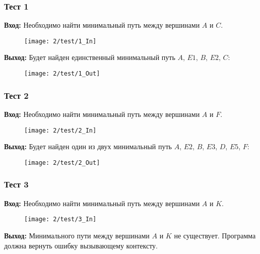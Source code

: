 \newpage

\subsubsection{Тест 1}
\textbf{Вход:}
Необходимо найти минимальный путь между вершинами $A$ и $C$. 

\begin{figure}[h!]
  \centering
  \texttt{[image: 2/test/1\_In]}
  \label{fig:Test1_In}
\end{figure}

\textbf{Выход:}
Будет найден единственный минимальный путь $A$, $E1$, $B$, $E2$, $C$:

\begin{figure}[h!]
  \centering
  \texttt{[image: 2/test/1\_Out]}
  \label{fig:Test1_Out}
\end{figure}

\newpage

\subsubsection{Тест 2}
\textbf{Вход:}
Необходимо найти минимальный путь между вершинами $A$ и $F$.

\begin{figure}[h!]
  \centering
  \texttt{[image: 2/test/2\_In]}
  \label{fig:Test2_In}
\end{figure}

\textbf{Выход:}
Будет найден один из двух минимальный путь $A$, $E2$, $B$, $E3$, $D$, $E5$, $F$:

\begin{figure}[h!]
  \centering
  \texttt{[image: 2/test/2\_Out]}
  \label{fig:Test2_Out}
\end{figure}

\newpage

\subsubsection{Тест 3}
\textbf{Вход:}
Необходимо найти минимальный путь между вершинами $A$ и $K$. 

\begin{figure}[h!]
  \centering
  \texttt{[image: 2/test/3\_In]}
  \label{fig:Test3_In}
\end{figure}


\textbf{Выход:}
Минимального пути между вершинами $A$ и $K$ не существует. Программа должна вернуть ошибку вызывающему контексту.

